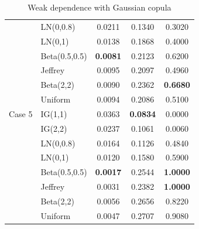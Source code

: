 \documentclass{amsart}
\begin{document}
\begin{table}[ht]
\begin{tabular}{l|l|ccc}
   & LN(0,0.8) & 0.0211 & 0.1340 & 0.3020 \\ 
   & LN(0,1) & 0.0138 & 0.1868 & 0.4000 \\ 
   & Beta(0.5,0.5) & \textbf{0.0081} & 0.2123 & 0.6200 \\ 
   & Jeffrey & 0.0095 & 0.2097 & 0.4960 \\ 
   & Beta(2,2) & 0.0090 & 0.2362 & \textbf{0.6680} \\ 
   & Uniform & 0.0094 & 0.2086 & 0.5100 \\ 
   \midrule
Case 5 & IG(1,1) & 0.0363 & \textbf{0.0834} & 0.0000 \\ 
   & IG(2,2) & 0.0237 & 0.1061 & 0.0060 \\ 
   & LN(0,0.8) & 0.0164 & 0.1126 & 0.4840 \\ 
   & LN(0,1) & 0.0120 & 0.1580 & 0.5900 \\ 
   & Beta(0.5,0.5) & \textbf{0.0017} & 0.2544 & \textbf{1.0000} \\ 
   & Jeffrey & 0.0031 & 0.2382 & \textbf{1.0000} \\ 
   & Beta(2,2) & 0.0056 & 0.2656 & 0.8220 \\ 
   & Uniform & 0.0047 & 0.2707 & 0.9080 \\ 
   \bottomrule
\end{tabular}
\caption{Weak dependence with Gaussian copula}
\end{table}
\end{document}
